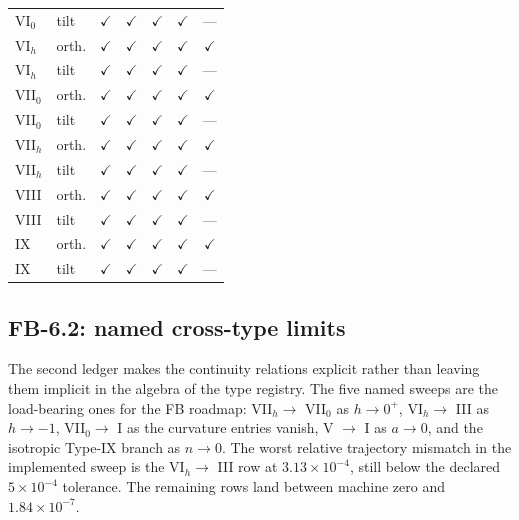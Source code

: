 \begin{table}[p]
\begin{tabular}{llccccc}
VI$_0$ & tilt  & $\checkmark$ & $\checkmark$ & $\checkmark$ & $\checkmark$ & --- \\
VI$_h$ & orth. & $\checkmark$ & $\checkmark$ & $\checkmark$ & $\checkmark$ & $\checkmark$ \\
VI$_h$ & tilt  & $\checkmark$ & $\checkmark$ & $\checkmark$ & $\checkmark$ & --- \\
VII$_0$& orth. & $\checkmark$ & $\checkmark$ & $\checkmark$ & $\checkmark$ & $\checkmark$ \\
VII$_0$& tilt  & $\checkmark$ & $\checkmark$ & $\checkmark$ & $\checkmark$ & --- \\
VII$_h$& orth. & $\checkmark$ & $\checkmark$ & $\checkmark$ & $\checkmark$ & $\checkmark$ \\
VII$_h$& tilt  & $\checkmark$ & $\checkmark$ & $\checkmark$ & $\checkmark$ & --- \\
VIII   & orth. & $\checkmark$ & $\checkmark$ & $\checkmark$ & $\checkmark$ & $\checkmark$ \\
VIII   & tilt  & $\checkmark$ & $\checkmark$ & $\checkmark$ & $\checkmark$ & --- \\
IX     & orth. & $\checkmark$ & $\checkmark$ & $\checkmark$ & $\checkmark$ & $\checkmark$ \\
IX     & tilt  & $\checkmark$ & $\checkmark$ & $\checkmark$ & $\checkmark$ & --- \\
\hline\hline
\end{tabular}
\end{table}

\subsection{FB-6.2: named cross-type limits}

The second ledger makes the continuity relations explicit rather than
leaving them implicit in the algebra of the type registry.  The five
named sweeps are the load-bearing ones for the FB roadmap:
VII$_h \rightarrow$ VII$_0$ as $h \rightarrow 0^+$,
VI$_h \rightarrow$ III as $h \rightarrow -1$,
VII$_0 \rightarrow$ I as the curvature entries vanish,
V $\rightarrow$ I as $a \rightarrow 0$, and the isotropic Type-IX branch
as $n \rightarrow 0$.  The worst relative trajectory mismatch in the
implemented sweep is the VI$_h \rightarrow$ III row at
$3.13\times 10^{-4}$, still below the declared
$5\times 10^{-4}$ tolerance.  The remaining rows land between machine
zero and $1.84\times 10^{-7}$.

